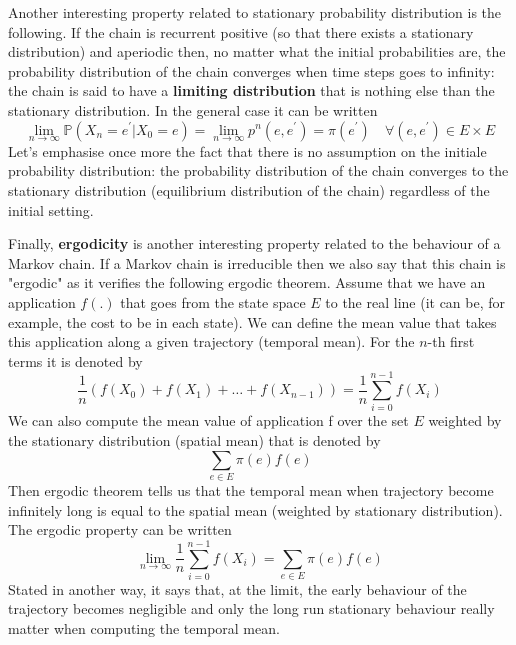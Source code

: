 Another interesting property related to stationary probability distribution is the following. If the chain is recurrent positive (so that there exists a stationary distribution) and aperiodic then, no matter what the initial probabilities are, the probability distribution of the chain converges when time steps goes to infinity: the chain is said to have a \textbf{limiting distribution} that is nothing else than the stationary distribution. In the general case it can be written
\begin{equation}\lim _{n \rightarrow \infty} \mathbb{P}\left(X_{n}=e^{\prime} | X_{0}=e\right)=\lim _{n \rightarrow \infty} p^{n}\left(e, e^{\prime}\right)=\pi\left(e^{\prime}\right) \quad \forall\left(e, e^{\prime}\right) \in E \times E\end{equation}
Let's emphasise once more the fact that there is no assumption on the initiale probability distribution: the probability distribution of the chain converges to the stationary distribution (equilibrium distribution of the chain) regardless of the initial setting.

Finally, \textbf{ergodicity} is another interesting property related to the behaviour of a Markov chain. If a Markov chain is irreducible then we also say that this chain is "ergodic" as it verifies the following ergodic theorem. Assume that we have an application $f(.)$ that goes from the state space $E$ to the real line (it can be, for example, the cost to be in each state). We can define the mean value that takes this application along a given trajectory (temporal mean). For the $n$-th first terms it is denoted by
\begin{equation}\frac{1}{n}\left(f\left(X_{0}\right)+f\left(X_{1}\right)+\ldots+f\left(X_{n-1}\right)\right)=\frac{1}{n} \sum_{i=0}^{n-1} f\left(X_{i}\right)\end{equation}
We can also compute the mean value of application f over the set $E$ weighted by the stationary distribution (spatial mean) that is denoted by
\begin{equation}\sum_{e \in E} \pi(e) f(e)\end{equation}
Then ergodic theorem tells us that the temporal mean when trajectory become infinitely long is equal to the spatial mean (weighted by stationary distribution). The ergodic property can be written
\begin{equation}\lim _{n \rightarrow \infty} \frac{1}{n} \sum_{i=0}^{n-1} f\left(X_{i}\right)=\sum_{e \in E} \pi(e) f(e)\end{equation}
Stated in another way, it says that, at the limit, the early behaviour of the trajectory becomes negligible and only the long run stationary behaviour really matter when computing the temporal mean.

